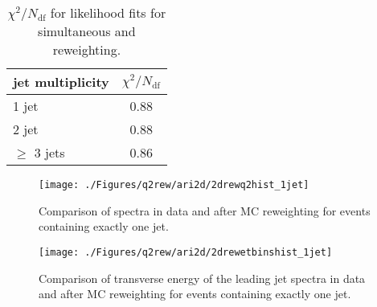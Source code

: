 \begin{table}%
\begin{center}
\begin{tabular}{l|c}
jet multiplicity & $\chi^2/N_\text{df}$ \\
\hline
1 jet & 0.88 \\
2 jet & 0.88 \\
$\geq$ 3 jets & 0.86 \\
\end{tabular}
\end{center}
\caption{$\chi^2/N_\text{df}$ for likelihood fits for simultaneous \qsq and \etjetb reweighting.}
\label{tab:chi2q2ariadnerew}
\end{table}

\begin{figure}[t!]%
\centering
\texttt{[image: ./Figures/q2rew/ari2d/2drewq2hist\_1jet]}%
\caption{Comparison of \qsq spectra in data and \ariadne after MC reweighting for events containing exactly one jet.}%
\label{fig:2dq2rew_q2_1jet}%
\end{figure}

\begin{figure}[p]%
\centering
\texttt{[image: ./Figures/q2rew/ari2d/2drewetbinshist\_1jet]}%
\caption{Comparison of transverse energy of the leading jet spectra in data and \ariadne after MC reweighting for events containing exactly one jet.}%
\label{fig:2dq2rew_et_1jet}%
\end{figure}

